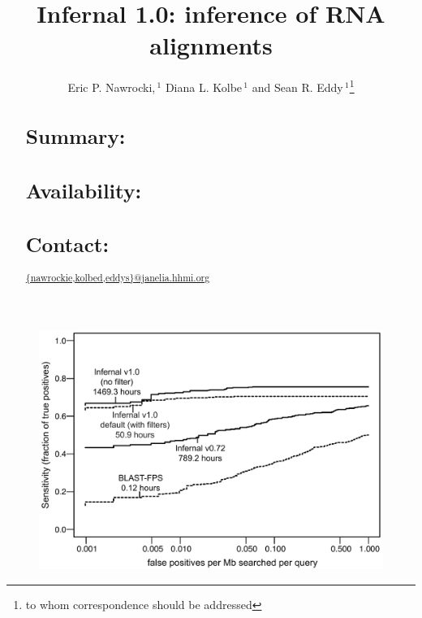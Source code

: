 \documentclass{bioinfo}
\begin{document}

\begin{application}

\title[Infernal 1.0]{Infernal 1.0: inference of RNA alignments}
\author[E. Nawrocki, D. Kolbe and S. Eddy]{Eric P. Nawrocki,\,$^1$ Diana L. Kolbe\,$^1$ and Sean R. Eddy\,$^1$\footnote{to whom correspondence should be addressed}}
\address{$^{1}$HHMI Janelia Farm Research Campus, Ashburn VA 20147, USA\\}



\maketitle

\begin{abstract}
\section{Summary:}

\section{Availability:}

\section{Contact:} \url{{nawrockie,kolbed,eddys}@janelia.hhmi.org}
\end{abstract}






\begin{figure}[!tpb]
\centerline{\includegraphics[scale=0.33]{figs/roc}}

\label{Fig:01}
\end{figure}


\end{application}
\end{document}
